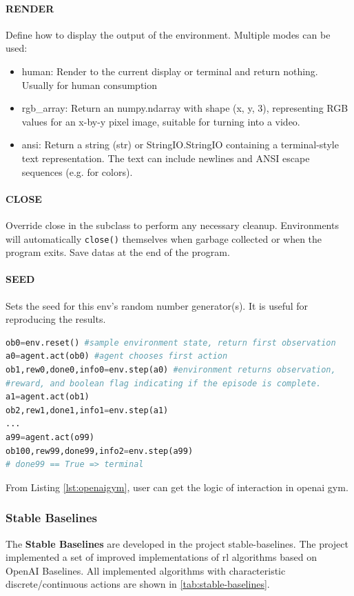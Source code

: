 \paragraph{RENDER} Define how to display the output of the environment. Multiple modes can be used: 
\begin{itemize}
	\item human: Render to the current display or terminal and return nothing. Usually for human consumption
	\item rgb\_array: Return an numpy.ndarray with shape (x, y, 3), representing RGB values for an x-by-y pixel image, suitable for turning into a video.
	\item ansi: Return a string (str) or StringIO.StringIO containing a terminal-style text representation. The text can include newlines and ANSI escape sequences (e.g. for colors).
\end{itemize}

\paragraph{CLOSE} Override close in the subclass to perform any necessary cleanup. Environments will automatically \texttt{close()} themselves when garbage collected or when the program exits. Save datas at the end of the program.
\paragraph{SEED} Sets the seed for this env's random number generator(s). It is useful for reproducing the results.
\begin{lstlisting}[caption={Logic of \gls{openai gym} Interaction},label={lst:openaigym},language=python]
ob0=env.reset() #sample environment state, return first observation
a0=agent.act(ob0) #agent chooses first action
ob1,rew0,done0,info0=env.step(a0) #environment returns observation,
#reward, and boolean flag indicating if the episode is complete.
a1=agent.act(ob1)
ob2,rew1,done1,info1=env.step(a1)
...
a99=agent.act(o99)
ob100,rew99,done99,info2=env.step(a99)
# done99 == True => terminal
\end{lstlisting}

From Listing \ref{lst:openaigym}, user can get the logic of interaction in \gls{openai gym}.

\subsubsection{Stable Baselines} \label{backgrounds:stable-baselines}
The \textbf{Stable Baselines} are developed in the project stable-baselines\parencite{stable-baselines}. The project implemented a set of improved implementations of \gls{rl} algorithms based on OpenAI Baselines\parencite{baselines}. All implemented algorithms with characteristic discrete/continuous actions are shown in \ref{tab:stable-baselines}.

